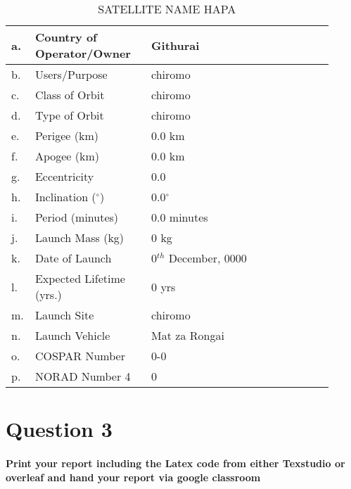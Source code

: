 \documentclass[12pt, a4paper]{article}
\begin{document}
	\begin{table}[ht]
		\centering
		\caption{SATELLITE NAME HAPA}
		{\renewcommand{\arraystretch}{2}
			\begin{tabular}{|m{0.01\linewidth}|m{0.35\linewidth}|m{0.55\linewidth}|} %
				\hline
				a. & Country of Operator/Owner & Githurai \\
				\hline
				b. & Users/Purpose & chiromo \\
				\hline
				c. & Class of Orbit &  chiromo \\
				\hline
				d. & Type of Orbit & chiromo \\
				\hline
				e. & Perigee (km) & 0.0 km \\
				\hline
				f. & Apogee (km) & 0.0 km \\
				\hline
				g. & Eccentricity & 0.0 \\
				\hline
				h. & Inclination ($^\circ$) &0.0$^\circ$ \\
				\hline
				i. & Period (minutes) & 0.0 minutes\\
				\hline
				j. & Launch Mass (kg) & 0 kg \\
				\hline
				k. & Date of Launch & 0$^{th}$ December, 0000\\
				\hline
				l. & Expected Lifetime (yrs.) & 0 yrs\\
				\hline
				m. & Launch Site & chiromo  \\
				\hline
				n. & Launch Vehicle &  	Mat za Rongai \\
				\hline
				o. & COSPAR Number & 0-0\\
				\hline
				p. & NORAD Number 4 & 0 \\
				\hline
		\end{tabular}}
	\end{table}
	
	
	
	\pagebreak
	\section*{Question 3}
	\paragraph*{Print your report including the Latex code from either Texstudio or overleaf and hand your report via google classroom}
	
	
	
\end{document}
